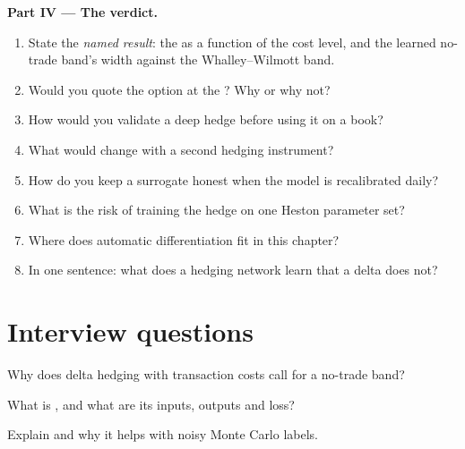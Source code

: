 \begin{problem}
\medskip\noindent\textbf{Part IV --- The verdict.}
\begin{enumerate}[resume]
\item State the \emph{named result}: the  as a function of the cost level, and the learned no-trade band's
width against the Whalley--Wilmott band.
\item Would you quote the option at the ? Why or why not?
\item How would you validate a deep hedge before using it on a book?
\item What would change with a second hedging instrument?
\item How do you keep a surrogate honest when the model is recalibrated daily?
\item What is the risk of training the hedge on one Heston parameter set?
\item Where does automatic differentiation fit in this chapter?
\item In one sentence: what does a hedging network learn that a delta does not?
\end{enumerate}
\end{problem}

\section{Interview questions}

\begin{interviewq}\label{iq:ml:deep-hedging-and-machine-learning-in-pricing:1}
Why does delta hedging with transaction costs call for a no-trade band?
\end{interviewq}

\begin{interviewq}\label{iq:ml:deep-hedging-and-machine-learning-in-pricing:2}
What is , and what are its inputs, outputs and loss?
\end{interviewq}

\begin{interviewq}\label{iq:ml:deep-hedging-and-machine-learning-in-pricing:3}
Explain  and why it helps with noisy Monte Carlo labels.
\end{interviewq}

